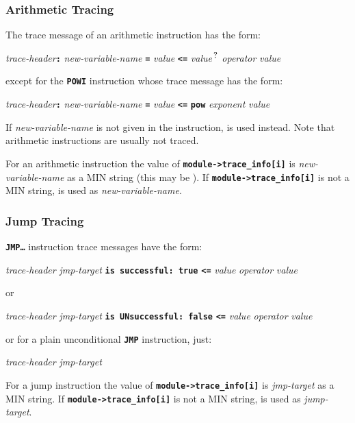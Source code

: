\documentclass[12pt]{article}
\newcommand{\TT}[1]{{\tt \bfseries #1}}
\newcommand{\QMARK}{{$^{\,\mbox{\footnotesize ?}}$}}
\newcommand{\EOL}{\penalty \exhyphenpenalty}
\begin{document}
\subsubsection{Arithmetic Tracing}
\label{ARITHMETIC-TRACING}

The trace message of an arithmetic instruction has the form:
\begin{center}
{\em trace-header}\TT{:} {\em new-variable-name} \TT{=} {\em value}
                    \TT{<=} {\em value}\QMARK{}
                    {\em operator} {\em value}
\end{center}
except for the \TT{POWI} instruction whose trace message has the form:
\begin{center}
{\em trace-header}\TT{:} {\em new-variable-name} \TT{=} {\em value}
                    \TT{<=} \TT{pow} {\em exponent} {\em value}
\end{center}
If {\em new-variable-name} is not given in the instruction,
\TT{*} is used instead.
Note that arithmetic instructions are usually not traced.

For an arithmetic instruction the value of
\TT{module->\EOL trace\_\EOL info[i]} is {\em new-variable-name}
as a MIN string (this may be \TT{*}).
If \TT{module->\EOL trace\_\EOL info[i]} is not a MIN string,
\TT{*} is used as {\em new-variable-name}.

\subsubsection{Jump Tracing}
\label{JUMP-TRACING}

\TT{JMP\ldots} instruction trace messages have the form:

\begin{center}
{\em trace-header} {\em jmp-target} \TT{is successful:~true}
                    \TT{<=} {\em value} {\em operator} {\em value}
\end{center}
or
\begin{center}
{\em trace-header} {\em jmp-target} \TT{is UNsuccessful:~false}
                    \TT{<=} {\em value} {\em operator} {\em value}
\end{center}

or for a plain unconditional \TT{JMP} instruction, just:
\begin{center}
{\em trace-header} {\em jmp-target}
\end{center}

For a jump instruction the value of
\TT{module->\EOL trace\_\EOL info[i]} is {\em jmp-target}
as a MIN string.
If \TT{module->\EOL trace\_\EOL info[i]} is not a MIN string,
\TT{*} is used as {\em jump-target}.
\end{document}
